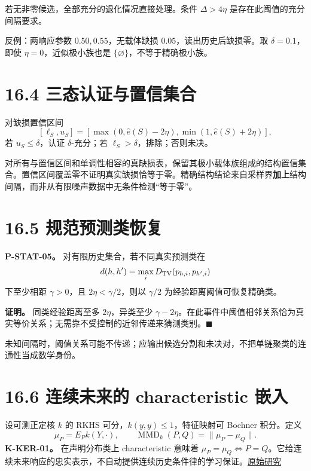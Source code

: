 \documentclass[
  11pt,
  oneside]{book}
\begin{document}
若无非零候选，全部充分的退化情况直接处理。条件 \(\Delta>4\eta\) 是存在此阈值的充分间隔要求。

反例：两响应参数 \(0.50,0.55\)，无载体缺损 \(0.05\)，读出历史后缺损零。取 \(\delta=0.1\)，即使 \(\eta=0\)，近似极小族也是 \(\{\varnothing\}\)，不等于精确极小族。

\section{16.4 三态认证与置信集合}\label{ux4e09ux6001ux8ba4ux8bc1ux4e0eux7f6eux4fe1ux96c6ux5408}

对缺损置信区间 \[[\ell_S,u_S]=
[\max(0,\widehat e(S)-2\eta),\min(1,\widehat e(S)+2\eta)],\] 若 \(u_S\le\delta\)，认证 \(\delta\)-充分；若 \(\ell_S>\delta\)，排除；否则未决。

对所有与置信区间和单调性相容的真缺损表，保留其极小载体族组成的结构置信集合。置信区间覆盖零不证明真实缺损恰等于零。精确结构结论来自采样界\textbf{加上}结构间隔，而非从有限噪声数据中无条件检测``等于零''。

\section{16.5 规范预测类恢复}\label{ux89c4ux8303ux9884ux6d4bux7c7bux6062ux590d}

\hypertarget{p-stat-05}{}\label{p-stat-05}

\textbf{P-STAT-05。} 对有限历史集合，若不同真实预测类在 \[d(h,h')=\max_iD_{\rm TV}(p_{h,i},p_{h',i})\] 下至少相距 \(\gamma>0\)，且 \(2\eta<\gamma/2\)，则以 \(\gamma/2\) 为经验距离阈值可恢复精确类。

\textbf{证明。} 同类经验距离至多 \(2\eta\)，异类至少 \(\gamma-2\eta\)。在此事件中阈值相邻关系恰为真实等价关系；无需靠不受控制的近邻传递来猜测类别。\(\blacksquare\)

未知间隔时，阈值关系可能不传递；应输出候选分割和未决对，不把单链聚类的连通性当成数学身份。

\section{16.6 连续未来的 characteristic 嵌入}\label{ux8fdeux7eedux672aux6765ux7684-characteristic-ux5d4cux5165}

设可测正定核 \(k\) 的 RKHS 可分，\(k(y,y)\le1\)，特征映射可 Bochner 积分。定义 \[\mu_P=E_Pk(Y,\cdot),\qquad
\operatorname{MMD}_k(P,Q)=\|\mu_P-\mu_Q\|.\] \textbf{K-KER-01。} 在声明分布类上 characteristic 意味着 \(\mu_P=\mu_Q\iff P=Q\)。它给连续未来响应的忠实表示，不自动提供连续历史条件律的学习保证。\href{https://www.jmlr.org/papers/volume13/gretton12a/gretton12a.pdf}{原始研究}
\end{document}
